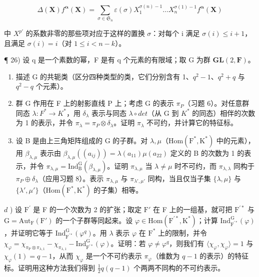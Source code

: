 \[
\Delta (\mathbf {X}) f ^ {\boldsymbol {\alpha}} (\mathbf {X}) = \sum_ {\sigma \in \mathfrak {S} _ {n}} \varepsilon (\sigma) X _ {1} ^ {\sigma (n) - 1} \dots X _ {n} ^ {\sigma (1) - 1} f ^ {\boldsymbol {\alpha}} (\mathbf {X})
\]

中 \(X^{p'}\) 的系数非零的那些项对应于这样的置换 \(\sigma\)：对每个 i 满足 \(\sigma(i) \leqslant i + 1\)，且满足 \(\sigma(i) = i\)（对 \(1 \leqslant i < n - k\)）。

¶ 26) 设 q 是一个素数的幂，F 是有 q 个元素的有限域；取 G 为群 \(\mathbf{GL}(2, \mathbf{F})\)。

\begin{enumerate}
\def\labelenumi{\alph{enumi})}
\item
  描述 G 的共轭类（区分四种类型的类，它们分别含有 1、\(q^{2}-1\)、\(q^{2}+q\) 与 \(q^{2}-q\) 个元素）。
\item
  群 G 作用在 F 上的射影直线 P 上；考虑 G 的表示 \(\pi_{P}\)（习题 6）。对任意群同态 \(\lambda : F^{*} \to K^{*}\)，用 \(\delta_{\lambda}\) 表示与同态 \(\lambda \circ det\)（从 G 到 \(K^{*}\) 的同态）相伴的次数为 1 的表示，并令 \(\pi_{\lambda} = \pi_{P} \otimes \delta_{\lambda}\)。证明 \(\pi_{\lambda}\) 不可约，并计算它的特征标。
\item
  设 B 是由上三角矩阵组成的 G 的子群。对 \(\lambda,\mu\)（\(\mathrm{Hom}(\mathrm{F}^{*},\mathrm{K}^{*})\) 中的元素），用 \(\beta_{\lambda,\mu}\) 表示由 \(\beta_{\lambda,\mu}((a_{ij}))=\lambda(a_{11})\mu(a_{22})\) 定义的 B 的次数为 1 的表示，并令 \(\pi_{\lambda,\mu}=\mathrm{Ind}_{\mathrm{B}}^{\mathrm{G}}(\beta_{\lambda,\mu})\)。证明 \(\pi_{\lambda,\mu}\) 当 \(\lambda\neq\mu\) 时不可约，而 \(\pi_{\lambda,\lambda}\) 同构于 \(\pi_{P}\oplus\delta_{\lambda}\)（应用习题 8）。表示 \(\pi_{\lambda,\mu}\) 与 \(\pi_{\lambda',\mu'}\) 同构，当且仅当子集 \(\{\lambda,\mu\}\) 与 \(\{\lambda',\mu'\}\)（\(\mathrm{Hom}(\mathrm{F}^{*},\mathrm{K}^{*})\) 的子集）相等。
\end{enumerate}

\(d\) ) 设 \(\mathrm{F}^{\prime}\) 是 F 的一个次数为 2 的扩张；取定 \(\mathrm{F}'\) 在 F 上的一组基，就可把 \(\mathrm{F}^{\prime *}\) 与 \(\mathrm{G} = \mathrm{Aut}_{\mathrm{F}}(\mathrm{F}')\) 的一个子群等同起来。设 \(\varphi \in \mathrm{Hom}(\mathrm{F}^{\prime *},\mathrm{K}^{*})\)；计算 \(\mathrm{Ind}_{\mathrm{F}^{\prime *}}^{\mathrm{G}}(\varphi)\)，并证明它等于 \(\mathrm{Ind}_{\mathrm{F}^{\prime *}}^{\mathrm{G}}(\varphi^q)\)。用 \(\lambda\) 表示 \(\varphi\) 在 \(\mathrm{F}^*\) 上的限制，并令 \(\chi_{\varphi} = \chi_{\pi_{\mathrm{P}}\otimes \pi_{\lambda ,1}} - \chi_{\pi_{\lambda ,1}} - \mathrm{Ind}_{\mathrm{F}^{\prime *}}^{\mathrm{G}}(\varphi)\)。证明：若 \(\varphi \neq \varphi^q\)，则我们有 \(\langle \chi_{\varphi},\chi_{\varphi}\rangle = 1\) 与 \(\chi_{\varphi}(1) = q - 1\)，从而 \(\chi_{\varphi}\) 是一个不可约表示 \(\pi_{\varphi}\)（维数为 \(q - 1\) 的表示）的特征标。证明用这种方法我们得到 \(\frac{1}{2} q(q - 1)\) 个两两不同构的不可约表示。


